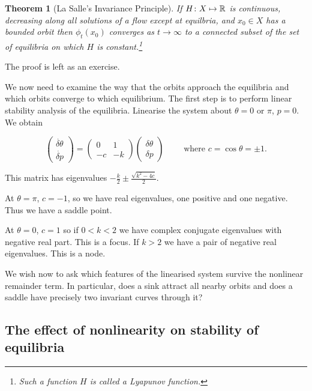 \documentclass{notes}
\theoremstyle{plain}
\newtheorem*{theorem}{Theorem}
\begin{document}
\begin{theorem}[La Salle's Invariance Principle]
  If $H \colon X \mapsto \mathbb{R}$ is continuous, decreasing along all solutions
  of a flow except at equilbria, and $x_0 \in X$ has a bounded orbit
  then $\phi_t(x_0)$ converges as $t \rightarrow \infty$ to a
  connected subset of the set of equilibria on which $H$ is
  constant.\footnote{Such a function $H$ is called a Lyapunov
    function.}
\end{theorem}

The proof is left as an exercise.

We now need to examine the way that the orbits approach the equilibria
and which orbits converge to which equilibrium.  The first step is to
perform linear stability analysis of the equilibria.  Linearise the
system about $\theta = 0 \text{ or } \pi$, $p = 0$.  We obtain

\[
\left(
\begin{matrix}
  \dot{\delta \theta} \\ \dot{\delta p}
\end{matrix}
\right) = \left(
\begin{matrix}
  0 & 1 \\ -c & -k
\end{matrix}  
\right) \left(
\begin{matrix}
  \delta \theta \\ \delta p
\end{matrix}
\right) \qquad \text{ where } c = \cos \theta = \pm 1.
\]

This matrix has eigenvalues $-\tfrac{k}{2} \pm \tfrac{\sqrt{k^2-4
    c}}{2}$.

At $\theta = \pi$, $c = -1$, so we have real eigenvalues, one positive
and one negative.  Thus we have a saddle point.

At $\theta = 0$, $c = 1$ so if $0 < k < 2$ we have complex conjugate
eigenvalues with negative real part.  This is a focus.  If $k > 2$ we
have a pair of negative real eigenvalues.  This is a node.

We wish now to ask which features of the linearised system survive the
nonlinear remainder term.  In particular, does a sink attract all nearby
orbits and does a saddle have precisely two invariant curves through it?

\subsection{The effect of nonlinearity on stability of equilibria}
\end{document}

